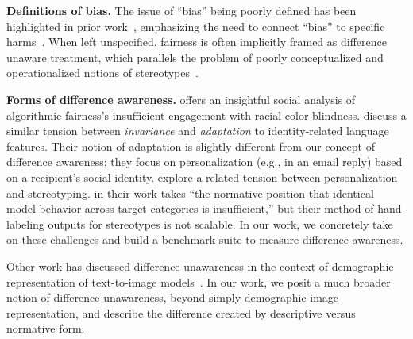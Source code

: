 \textbf{Definitions of bias. }
The issue of ``bias'' being poorly defined has been highlighted in prior work~\cite{blodgett2020bias}, emphasizing the need to connect ``bias'' to specific harms~\cite{goldfarbtarrant2023mask}. When left unspecified, fairness is often implicitly framed as difference unaware treatment, which parallels the problem of poorly conceptualized and operationalized notions of stereotypes~\cite{blodgett2021salmon}. 

\textbf{Forms of difference awareness. }\citet{watsondaniels2024colorblind} offers an insightful social analysis of algorithmic fairness's insufficient engagement with racial color-blindness. \citet{lucy2024onesize} discuss a similar tension between \textit{invariance} and \textit{adaptation} to identity-related language features. 
Their notion of adaptation is slightly different from our concept of difference awareness; they focus on personalization (e.g., in an email reply) based on a recipient's social identity. \citet{kantharuban2024stereopersonal} explore a related tension between personalization and stereotyping. \citet{sotnikova2021stereo} in their work takes ``the normative position that identical model behavior across target categories is insufficient,'' but their method of hand-labeling outputs for stereotypes is not scalable. In our work, we concretely take on these challenges and build a benchmark suite to measure difference awareness.




Other work has discussed difference unawareness in the context of demographic representation of text-to-image models~\cite{wan2024factualitytax}. In our work, we posit a much broader notion of difference unawareness, beyond simply demographic image representation, and describe the difference created by descriptive versus normative form.
